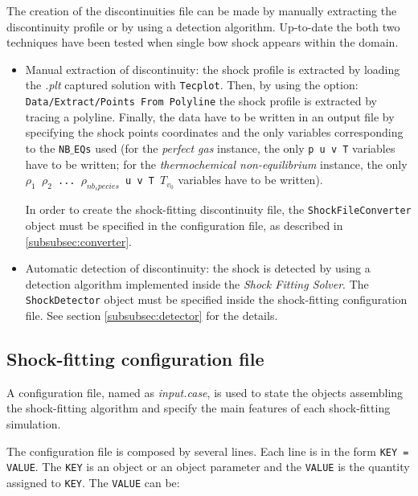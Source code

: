 \documentclass[11pt,a4paper,oneside]{article}
\begin{document}
The creation of the discontinuities file can be made by manually extracting the discontinuity profile or by using a detection algorithm. Up-to-date the both two techniques have been tested when single bow shock appears within the domain.
\begin{itemize}
\item{Manual extraction of discontinuity: the shock profile is extracted by loading the \textit{.plt} captured solution with \texttt{Tecplot}. Then, by using the option:
\newline
\newline
\hspace*{0.5cm} \texttt{Data/Extract/Points From Polyline}
\newline
\newline
the shock profile is extracted by tracing a polyline.
Finally, the data have to be written in an output file by specifying the shock points coordinates and the only variables corresponding to the \texttt{NB$\_$EQs} used (for the \textit{perfect gas} instance, the only \texttt{p u v T} variables have to be written; for the \textit{thermochemical non-equilibrium} instance, the only \texttt{$\rho_1$ $\rho_2$ ... $\rho_{nb_species}$ u v T $T_{v_{0}}$} variables have to be written).

In order to create the shock-fitting discontinuity file, the \texttt{ShockFileConverter} object must be specified in the configuration file, as described in \ref{subsubsec:converter}.
}
\item{Automatic detection of discontinuity: the shock is detected by using a detection algorithm implemented inside the \textit{Shock Fitting Solver}. The \texttt{ShockDetector} object must be specified inside the shock-fitting configuration file. See section \ref{subsubsec:detector} for the details.}
\end{itemize}

\subsection{Shock-fitting configuration file}
\label{subsec: input file conf}

A configuration file, named as \textit{input.case}, is used to state the objects assembling the shock-fitting algorithm and specify the main features of each shock-fitting simulation.

The configuration file is composed by several lines. 
\newline
Each line is in the form \texttt{KEY = VALUE}.
The \texttt{KEY} is an object or an object parameter and the \texttt{VALUE} is the quantity assigned to \texttt{KEY}.
\newline
\newline
The \texttt{VALUE} can be:
\end{document}
